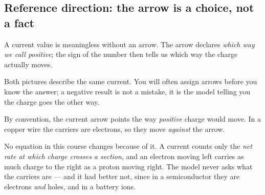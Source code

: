 \documentclass[11pt,a4paper]{article}
\newcommand{\Icol}[1]{\textcolor{ccur}{#1}}
\newcommand{\uni}[1]{\,\mathrm{#1}}
\newcommand{\A}{\uni{A}}   \newcommand{\V}{\uni{V}}
\begin{document}
\subsection{Reference direction: the arrow is a choice, not a fact}

A current value is meaningless without an arrow. The arrow declares \emph{which way we
call positive}; the sign of the number then tells us which way the charge actually moves.

\begin{center}
\end{center}

Both pictures describe the same current. You will often assign arrows before you know the
answer; a negative result is not a mistake, it is the model telling you the charge goes
the other way.

\begin{cautionbox}
By convention, the current arrow points the way \emph{positive} charge would move. In a
copper wire the carriers are electrons, so they move \emph{against} the arrow.

\smallskip
No equation in this course changes because of it. A current counts only the \emph{net
rate at which charge crosses a section}, and an electron moving left carries as much
charge to the right as a proton moving right. The model never asks what the carriers are
--- and it had better not, since in a semiconductor they are electrons \emph{and} holes,
and in a battery ions.
\end{cautionbox}
\end{document}
